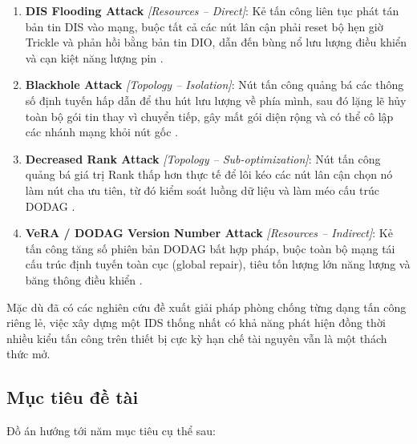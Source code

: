 \begin{enumerate}
    \item \textbf{DIS Flooding Attack} \textit{[Resources -- Direct]}:
          Kẻ tấn công liên tục phát tán bản tin DIS vào mạng, buộc tất cả
          các nút lân cận phải reset bộ hẹn giờ Trickle và phản hồi bằng
          bản tin DIO, dẫn đến bùng nổ lưu lượng điều khiển và cạn kiệt
          năng lượng pin \cite{prajisha2025dis}.

    \item \textbf{Blackhole Attack} \textit{[Topology -- Isolation]}:
          Nút tấn công quảng bá các thông số định tuyến hấp dẫn để thu
          hút lưu lượng về phía mình, sau đó lặng lẽ hủy toàn bộ gói tin
          thay vì chuyển tiếp, gây mất gói diện rộng và có thể cô lập
          các nhánh mạng khỏi nút gốc \cite{sharma2022blackhole}.

    \item \textbf{Decreased Rank Attack} \textit{[Topology --
          Sub-optimization]}: Nút tấn công quảng bá giá trị Rank thấp hơn
          thực tế để lôi kéo các nút lân cận chọn nó làm nút cha ưu tiên,
          từ đó kiểm soát luồng dữ liệu và làm méo cấu trúc DODAG
          \cite{decrank2022}.

    \item \textbf{VeRA / DODAG Version Number Attack} \textit{[Resources
          -- Indirect]}: Kẻ tấn công tăng số phiên bản DODAG bất hợp
          pháp, buộc toàn bộ mạng tái cấu trúc định tuyến toàn cục
          (global repair), tiêu tốn lượng lớn năng lượng và băng thông
          điều khiển \cite{dvir2011vera}.
\end{enumerate}

Mặc dù đã có các nghiên cứu đề xuất giải pháp phòng chống từng dạng tấn
công riêng lẻ, việc xây dựng một IDS thống nhất có khả năng phát hiện đồng
thời nhiều kiểu tấn công trên thiết bị cực kỳ hạn chế tài nguyên vẫn là
một thách thức mở.

\subsection{Mục tiêu đề tài}
\label{subsec:objectives}

Đồ án hướng tới năm mục tiêu cụ thể sau:

